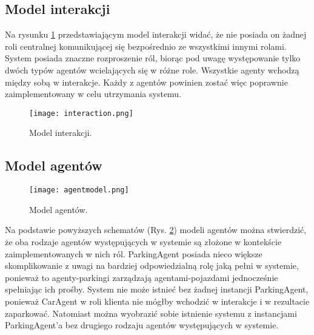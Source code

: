
\newpage
\subsection{Model interakcji}

Na rysunku \ref{fig:interaction} przedstawiającym model interakcji widać, że nie posiada on żadnej roli centralnej komunikującej się bezpośrednio ze wszystkimi innymi rolami. System posiada znaczne rozproszenie ról, biorąc pod uwagę występowanie tylko dwóch typów agentów wcielających się w różne role. Wszystkie agenty wchodzą między sobą w interakcje. Każdy z agentów powinien zostać więc poprawnie zaimplementowany w celu utrzymania systemu.

\begin{figure}[h!]
    \centering \texttt{[image: interaction.png]}
    \caption{Model interakcji.}
    \label{fig:interaction}
\end{figure}




\newpage
\subsection{Model agentów}

\begin{figure}[h!]
    \centering \texttt{[image: agentmodel.png]}
    \caption{Model agentów.}
    \label{fig:agentmodel}
\end{figure}

Na podstawie powyższych schematów (Rys. \ref{fig:agentmodel}) modeli agentów można stwierdzić, że oba rodzaje agentów  występujących w systemie są złożone w kontekście zaimplementowanych w nich ról. ParkingAgent posiada nieco większe skomplikowanie z uwagi na bardziej odpowiedzialną rolę jaką pełni w systemie, ponieważ to agenty-parkingi zarządzają agentami-pojazdami jednocześnie spełniając ich prośby. System nie może istnieć bez żadnej instancji ParkingAgent, ponieważ CarAgent w roli klienta nie mógłby wchodzić w interakcje i w rezultacie zaparkować. Natomiast można wyobrazić sobie istnienie systemu z instancjami ParkingAgent’a bez drugiego rodzaju agentów występujących w systemie.

\newpage
